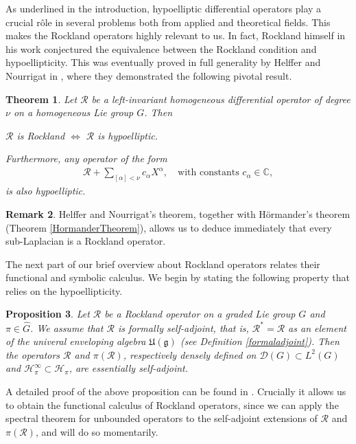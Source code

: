 \documentclass[12pt,oneside,a4paper]{book}
\numberwithin{equation}{section}     %
\theoremstyle{plain}
\newtheorem{theorem}{Theorem}[section]
\newtheorem{proposition}[theorem]{Proposition}
\theoremstyle{definition}
\newtheorem{remark}[theorem]{Remark}
\newcommand{\C}{{\mathbb C}}
\begin{document}
As underlined in the introduction, hypoelliptic differential operators play a crucial r\^ole in several problems both from applied and theoretical fields. This makes the Rockland operators highly relevant to us. In fact, Rockland himself in his work \cite{Rockland} conjectured the equivalence between the Rockland condition and hypoellipticity. This was eventually proved in full generality by Helffer and Nourrigat in \cite[Theorem 0.1]{HN-79}, where they demonstrated the following pivotal result.
\begin{theorem}\label{HelfferNourrigat}
	Let $\mathcal R$ be a left-invariant homogeneous differential operator of degree $\nu$ on a homogeneous Lie group $G$. Then
	\begin{center}
		$\mathcal{R}$ is Rockland $\iff$ $\mathcal{R}$ is hypoelliptic.
	\end{center}
	Furthermore, any operator of the form 
	\begin{align*}
	\mathcal{R}+\sum_{[\alpha]<\nu}c_\alpha X^\alpha, \quad\text{with constants }c_\alpha\in\C,
	\end{align*}
	is also hypoelliptic.
\end{theorem}
\begin{remark}
	Helffer and Nourrigat's theorem, together with H\"ormander's theorem (Theorem \ref{HormanderTheorem}), allows us to deduce immediately that every sub-Laplacian is a Rockland operator.
\end{remark}

The next part of our brief overview about Rockland operators relates their functional and symbolic calculus. We begin by stating the following property that relies on the hypoellipticity.
\begin{proposition}\label{essentiallyselfadjoint}
	Let $\mathcal{R}$ be a Rockland operator on a graded Lie group $G$ and $\pi\in\widehat{G}$. We assume that $\mathcal{R}$ is formally self-adjoint, that is, $\mathcal{R}^*=\mathcal{R}$ as an element of the univeral enveloping algebra $\mathfrak{U}(\mathfrak{g})$ (see Definition \ref{formaladjoint}). Then the operators $\mathcal{R}$ and $\pi(\mathcal{R})$, respectively densely defined on $\mathcal{D}(G)\subset L^2(G)$ and $\mathcal{H}_\pi^\infty\subset\mathcal{H}_\pi$, are essentially self-adjoint.
\end{proposition}
A detailed proof of the above proposition can be found in \cite[Proposition 4.1.15]{FR2016}. Crucially it allows us to obtain the functional calculus of Rockland operators, since we can apply the spectral theorem for unbounded operators \cite[Theorem VIII.6]{RS1980} to the self-adjoint extensions of $\mathcal{R}$ and $\pi(\mathcal{R})$, and will do so momentarily.
\end{document}
